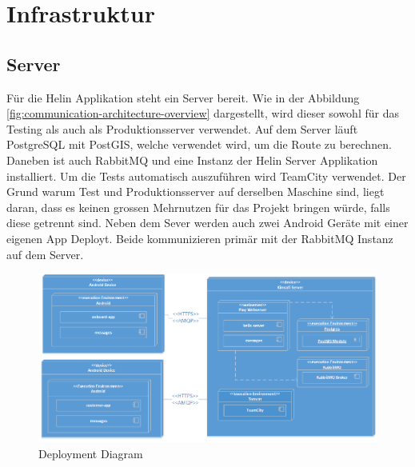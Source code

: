\newpage

\chapter{Infrastruktur}

\section{Server}

Für die Helin Applikation steht ein Server bereit. Wie in der Abbildung \ref{fig:communication-architecture-overview} dargestellt, wird dieser sowohl für das Testing als auch als Produktionsserver verwendet. 
Auf dem Server läuft PostgreSQL mit PostGIS, welche verwendet wird, um die Route zu berechnen. Daneben ist auch RabbitMQ und eine Instanz der Helin Server Applikation installiert.
Um die Tests automatisch auszuführen wird TeamCity verwendet. Der Grund warum Test und Produktionsserver auf derselben Maschine sind, liegt daran, dass es keinen grossen Mehrnutzen für das Projekt bringen würde, falls diese getrennt sind.
Neben dem Sever werden auch zwei Android Geräte mit einer eigenen App Deployt. Beide kommunizieren primär mit der RabbitMQ Instanz auf dem Server.

\begin{figure}[h]
	\includegraphics[width=1.0\textwidth]{images/DeploymentDiagram.png}
	\caption{Deployment Diagram}
	\label{fig:deployment-diagram}
\end{figure}


